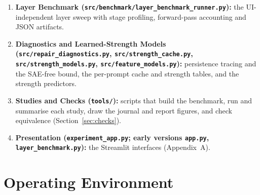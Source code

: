 \documentclass[12pt,a4paper]{report}
\begin{document}
\begin{enumerate}
  \item \textbf{Layer Benchmark (\texttt{src/\allowbreak{}benchmark/\allowbreak{}layer\_\allowbreak{}benchmark\_\allowbreak{}runner.\allowbreak{}py}):} the UI-independent layer sweep with stage profiling, forward-pass accounting and JSON artifacts.
  \item \textbf{Diagnostics and Learned-Strength Models (\texttt{src/\allowbreak{}repair\_\allowbreak{}diagnostics.\allowbreak{}py}, \texttt{src/\allowbreak{}strength\_\allowbreak{}cache.\allowbreak{}py}, \texttt{src/\allowbreak{}strength\_\allowbreak{}models.\allowbreak{}py}, \texttt{src/\allowbreak{}feature\_\allowbreak{}models.\allowbreak{}py}):} persistence tracing and the SAE-free bound, the per-prompt cache and strength tables, and the strength predictors.
  \item \textbf{Studies and Checks (\texttt{tools/\allowbreak{}}):} scripts that build the benchmark, run and summarise each study, draw the journal and report figures, and check equivalence (Section~\ref{sec:checks}).
  \item \textbf{Presentation (\texttt{experiment\_\allowbreak{}app.\allowbreak{}py}; early versions \texttt{app.\allowbreak{}py}, \texttt{layer\_\allowbreak{}benchmark.\allowbreak{}py}):} the Streamlit interfaces (Appendix~A).
\end{enumerate}

\section{Operating Environment}
\end{document}
